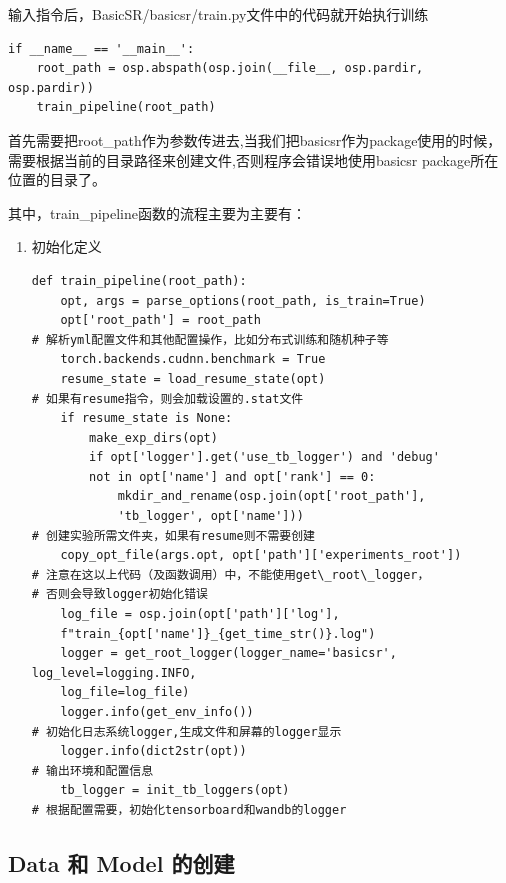 \documentclass[../main.tex]{subfiles}
\begin{document}
\begin{enumerate}
输入指令后，BasicSR/basicsr/train.py文件中的代码就开始执行训练
\begin{verbatim}
if __name__ == '__main__':
    root_path = osp.abspath(osp.join(__file__, osp.pardir, osp.pardir))
    train_pipeline(root_path)
\end{verbatim}
首先需要把root\_path作为参数传进去,当我们把basicsr作为package使用的时候，需要根据当前的目录路径来创建文件,否则程序会错误地使用basicsr package所在位置的目录了。

其中，train\_pipeline函数的流程主要为主要有：
\begin{enumerate}

\item 初始化定义

\begin{verbatim}
def train_pipeline(root_path):
    opt, args = parse_options(root_path, is_train=True)
    opt['root_path'] = root_path
# 解析yml配置文件和其他配置操作，比如分布式训练和随机种子等
    torch.backends.cudnn.benchmark = True
    resume_state = load_resume_state(opt)
# 如果有resume指令，则会加载设置的.stat文件
    if resume_state is None:
        make_exp_dirs(opt)
        if opt['logger'].get('use_tb_logger') and 'debug'
        not in opt['name'] and opt['rank'] == 0:
            mkdir_and_rename(osp.join(opt['root_path'],
            'tb_logger', opt['name']))
# 创建实验所需文件夹，如果有resume则不需要创建
    copy_opt_file(args.opt, opt['path']['experiments_root'])
# 注意在这以上代码（及函数调用）中，不能使用get\_root\_logger，
# 否则会导致logger初始化错误
    log_file = osp.join(opt['path']['log'],
    f"train_{opt['name']}_{get_time_str()}.log")
    logger = get_root_logger(logger_name='basicsr', log_level=logging.INFO,
    log_file=log_file)
    logger.info(get_env_info())
# 初始化日志系统logger,生成文件和屏幕的logger显示
    logger.info(dict2str(opt))
# 输出环境和配置信息
    tb_logger = init_tb_loggers(opt)
# 根据配置需要，初始化tensorboard和wandb的logger

\end{verbatim}
\end{enumerate}

\subsection{Data 和 Model 的创建}


\begin{enumerate}


\end{enumerate}
\end{enumerate}
\end{document}
